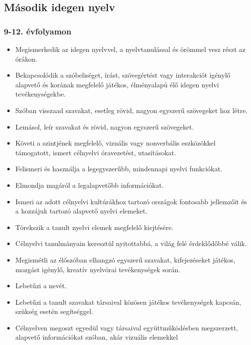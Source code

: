 \hypertarget{masodik-idegen-nyelv}{%
\subsection{Második idegen nyelv}\label{masodik-idegen-nyelv}}

\hypertarget{evfolyamon-27}{%
\subsubsection{9-12. évfolyamon}\label{evfolyamon-27}}

\begin{itemize}
\item
  Megismerkedik az idegen nyelvvel, a nyelvtanulással és örömmel vesz
  részt az órákon.
\item
  Bekapcsolódik a szóbeliséget, írást, szövegértést vagy interakciót
  igénylő alapvető és korának megfelelő játékos, élményalapú élő idegen
  nyelvi tevékenységekbe.
\item
  Szóban visszaad szavakat, esetleg rövid, nagyon egyszerű szövegeket
  hoz létre.
\item
  Lemásol, leír szavakat és rövid, nagyon egyszerű szövegeket.
\item
  Követi a szintjének megfelelő, vizuális vagy nonverbális eszközökkel
  támogatott, ismert célnyelvi óravezetést, utasításokat.
\item
  Felismeri és használja a legegyszerűbb, mindennapi nyelvi funkciókat.
\item
  Elmondja magáról a legalapvetőbb információkat.
\item
  Ismeri az adott célnyelvi kultúrákhoz tartozó országok fontosabb
  jellemzőit és a hozzájuk tartozó alapvető nyelvi elemeket.
\item
  Törekszik a tanult nyelvi elemek megfelelő kiejtésére.
\item
  Célnyelvi tanulmányain keresztül nyitottabbá, a világ felé
  érdeklődőbbé válik.
\item
  Megismétli az élőszóban elhangzó egyszerű szavakat, kifejezéseket
  játékos, mozgást igénylő, kreatív nyelvórai tevékenységek során.
\item
  Lebetűzi a nevét.
\item
  Lebetűzi a tanult szavakat társaival közösen játékos tevékenységek
  kapcsán, szükség esetén segítséggel.
\item
  Célnyelven megoszt egyedül vagy társaival együttműködésben
  megszerzett, alapvető információkat szóban, akár vizuális elemekkel

\end{itemize}

